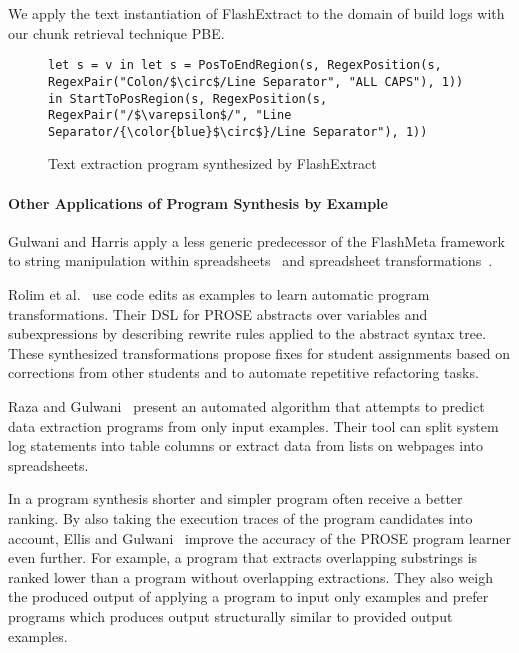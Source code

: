 \documentclass[\myrootdir/main.tex]{subfiles}
\begin{document}
We apply the text instantiation of FlashExtract to the domain of build logs with our chunk retrieval technique PBE\@.

\begin{figure}[]
  \centering
  \begin{lstlisting}[breaklines=true]
let s = v in let s = PosToEndRegion(s, RegexPosition(s, RegexPair("Colon/$\circ$/Line Separator", "ALL CAPS"), 1)) in StartToPosRegion(s, RegexPosition(s, RegexPair("/$\varepsilon$/", "Line Separator/{\color{blue}$\circ$}/Line Separator"), 1))
  \end{lstlisting}  
  \caption{Text extraction program synthesized by FlashExtract}
  \label{lst:prose-program}
\end{figure}

\paragraph{Other Applications of Program Synthesis by Example}
Gulwani and Harris apply a less generic predecessor of the FlashMeta framework to string manipulation within spreadsheets~\cite{gulwani2011automating} and spreadsheet transformations~\cite{harris2011spreadsheet}.

Rolim et al.~\cite{rolim2017learning} use code edits as examples to learn automatic program transformations.
Their DSL for PROSE abstracts over variables and subexpressions by describing rewrite rules applied to the abstract syntax tree.
These synthesized transformations propose fixes for student assignments based on corrections from other students and to automate repetitive refactoring tasks.

Raza and Gulwani~\cite{raza2017automated} present an automated algorithm that attempts to predict data extraction programs from only input examples.
Their tool can split system log statements into table columns or extract data from lists on webpages into spreadsheets.

In a program synthesis shorter and simpler program often receive a better ranking.
By also taking the execution traces of the program candidates into account, Ellis and Gulwani~\cite{ellis2017learning} improve the accuracy of the PROSE program learner even further.
For example, a program that extracts overlapping substrings is ranked lower than a program without overlapping extractions.
They also weigh the produced output of applying a program to input only examples and prefer programs which produces output structurally similar to provided output examples.
\end{document}

